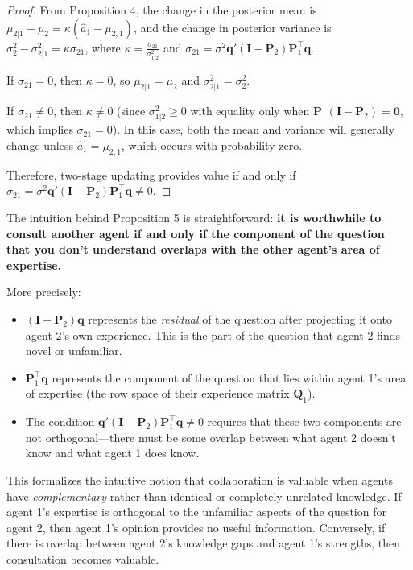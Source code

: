 \documentclass[\ifdraft draft\fi]{article}
\begin{document}
\begin{greyproof}
\begin{proof}
From Proposition 4, the change in the posterior mean is $\mu_{2|1} - \mu_2 = \kappa(\hat{a}_1 - \mu_{2,1})$, and the change in posterior variance is $\sigma_2^2 - \sigma_{2|1}^2 = \kappa \sigma_{21}$, where $\kappa = \frac{\sigma_{21}}{\sigma_{1|2}^2}$ and $\sigma_{21} = \sigma^2 \bm{q}'(\bm{I} - \bm{P}_2)\bm{P}_1^{\top}\bm{q}$.

If $\sigma_{21} = 0$, then $\kappa = 0$, so $\mu_{2|1} = \mu_2$ and $\sigma_{2|1}^2 = \sigma_2^2$. 

If $\sigma_{21} \neq 0$, then $\kappa \neq 0$ (since $\sigma_{1|2}^2 \geq 0$ with equality only when $\bm{P}_1(\bm{I} - \bm{P}_2) = \bm{0}$, which implies $\sigma_{21} = 0$). In this case, both the mean and variance will generally change unless $\hat{a}_1 = \mu_{2,1}$, which occurs with probability zero.

Therefore, two-stage updating provides value if and only if $\sigma_{21} = \sigma^2 \bm{q}'(\bm{I} - \bm{P}_2)\bm{P}_1^{\top}\bm{q} \neq 0$.
\end{proof}
\end{greyproof}

The intuition behind Proposition 5 is straightforward: \textbf{it is worthwhile to consult another agent if and only if the component of the question that you don't understand overlaps with the other agent's area of expertise.}

More precisely:
\begin{itemize}
    \item $(\bm{I} - \bm{P}_2)\bm{q}$ represents the \textit{residual} of the question after projecting it onto agent 2's own experience. This is the part of the question that agent 2 finds novel or unfamiliar.
    \item $\bm{P}_1^{\top}\bm{q}$ represents the component of the question that lies within agent 1's area of expertise (the row space of their experience matrix $\bm{Q}_1$).
    \item The condition $\bm{q}'(\bm{I} - \bm{P}_2)\bm{P}_1^{\top}\bm{q} \neq 0$ requires that these two components are not orthogonal—there must be some overlap between what agent 2 doesn't know and what agent 1 does know.
\end{itemize}

This formalizes the intuitive notion that collaboration is valuable when agents have \textit{complementary} rather than identical or completely unrelated knowledge. If agent 1's expertise is orthogonal to the unfamiliar aspects of the question for agent 2, then agent 1's opinion provides no useful information. Conversely, if there is overlap between agent 2's knowledge gaps and agent 1's strengths, then consultation becomes valuable.
\end{document}
